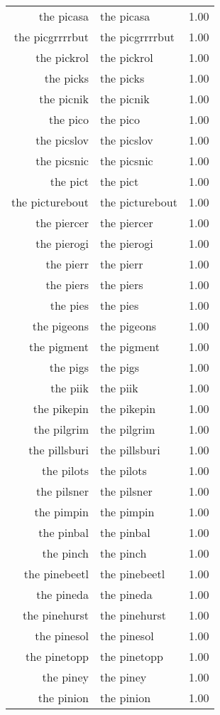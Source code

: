 \begin{table}[ht]
\begin{tabular}{rlr}
  the picasa & the picasa & 1.00 \\ 
  the picgrrrrbut & the picgrrrrbut & 1.00 \\ 
  the pickrol & the pickrol & 1.00 \\ 
  the picks & the picks & 1.00 \\ 
  the picnik & the picnik & 1.00 \\ 
  the pico & the pico & 1.00 \\ 
  the picslov & the picslov & 1.00 \\ 
  the picsnic & the picsnic & 1.00 \\ 
  the pict & the pict & 1.00 \\ 
  the picturebout & the picturebout & 1.00 \\ 
  the piercer & the piercer & 1.00 \\ 
  the pierogi & the pierogi & 1.00 \\ 
  the pierr & the pierr & 1.00 \\ 
  the piers & the piers & 1.00 \\ 
  the pies & the pies & 1.00 \\ 
  the pigeons & the pigeons & 1.00 \\ 
  the pigment & the pigment & 1.00 \\ 
  the pigs & the pigs & 1.00 \\ 
  the piik & the piik & 1.00 \\ 
  the pikepin & the pikepin & 1.00 \\ 
  the pilgrim & the pilgrim & 1.00 \\ 
  the pillsburi & the pillsburi & 1.00 \\ 
  the pilots & the pilots & 1.00 \\ 
  the pilsner & the pilsner & 1.00 \\ 
  the pimpin & the pimpin & 1.00 \\ 
  the pinbal & the pinbal & 1.00 \\ 
  the pinch & the pinch & 1.00 \\ 
  the pinebeetl & the pinebeetl & 1.00 \\ 
  the pineda & the pineda & 1.00 \\ 
  the pinehurst & the pinehurst & 1.00 \\ 
  the pinesol & the pinesol & 1.00 \\ 
  the pinetopp & the pinetopp & 1.00 \\ 
  the piney & the piney & 1.00 \\ 
  the pinion & the pinion & 1.00 \\ 

\end{tabular}
\end{table}
